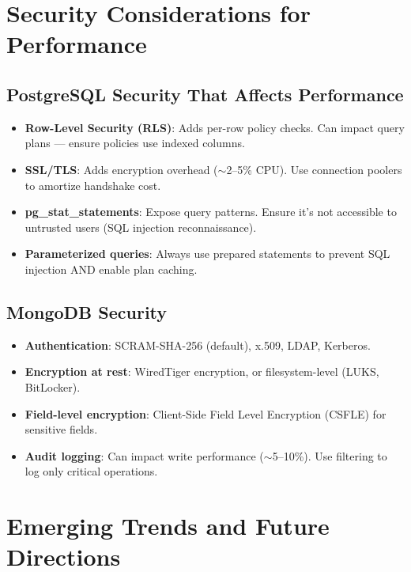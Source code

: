 \documentclass[12pt,a4paper]{article}
\begin{document}
\section{Security Considerations for Performance}

\subsection{PostgreSQL Security That Affects Performance}

\begin{itemize}
    \item \textbf{Row-Level Security (RLS)}: Adds per-row policy checks. Can impact query plans --- ensure policies use indexed columns.
    \item \textbf{SSL/TLS}: Adds encryption overhead ($\sim$2--5\% CPU). Use connection poolers to amortize handshake cost.
    \item \textbf{pg\_stat\_statements}: Expose query patterns. Ensure it's not accessible to untrusted users (SQL injection reconnaissance).
    \item \textbf{Parameterized queries}: Always use prepared statements to prevent SQL injection AND enable plan caching.
\end{itemize}

\subsection{MongoDB Security}

\begin{itemize}
    \item \textbf{Authentication}: SCRAM-SHA-256 (default), x.509, LDAP, Kerberos.
    \item \textbf{Encryption at rest}: WiredTiger encryption, or filesystem-level (LUKS, BitLocker).
    \item \textbf{Field-level encryption}: Client-Side Field Level Encryption (CSFLE) for sensitive fields.
    \item \textbf{Audit logging}: Can impact write performance ($\sim$5--10\%). Use filtering to log only critical operations.
\end{itemize}


\section{Emerging Trends and Future Directions}
\end{document}
